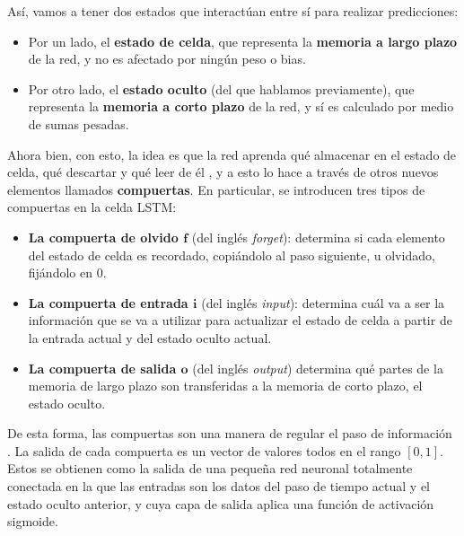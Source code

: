 \documentclass[../../main.tex]{subfiles}
\begin{document}
Así, vamos a tener dos estados que interactúan entre sí para realizar predicciones:
\begin{itemize}
    \item Por un lado, el \textbf{estado de celda}, que representa la \textbf{memoria a largo
    plazo} de la red, y no es afectado por ningún peso o bias.
    \item Por otro lado, el \textbf{estado oculto} (del que hablamos previamente), que
    representa la \textbf{memoria a corto plazo} de la red, y sí es calculado por medio
    de sumas pesadas.
\end{itemize}

Ahora bien, con esto, la idea es que la red aprenda qué almacenar en el estado de celda,
qué descartar y qué leer de él \cite{hands-on-ML-sklearn-tf}, y a esto lo hace a través de
otros nuevos elementos llamados \textbf{compuertas}. En particular, se introducen tres
tipos de compuertas en la celda LSTM:
\begin{itemize}
    \item \textbf{La compuerta de olvido \(\bm{f}\)} (del inglés \textit{forget}):
    determina si cada elemento del estado de celda es recordado, copiándolo al paso
    siguiente, u olvidado, fijándolo en 0.
    \item \textbf{La compuerta de entrada \(\bm{i}\)} (del inglés \textit{input}):
    determina cuál va a ser la información que se va a utilizar para actualizar
    el estado de celda a partir de la entrada actual y del estado oculto actual.
    \item \textbf{La compuerta de salida \(\bm{o}\)} (del inglés \textit{output})
    determina qué partes de la memoria de largo plazo son transferidas a la memoria
    de corto plazo, el estado oculto.
\end{itemize}

De esta forma, las compuertas son una manera de regular el paso de información
\cite{colahs-blog-lstm-2015}. La salida de cada compuerta es un vector de valores todos en
el rango \([0,1]\). Estos se obtienen como la salida de una pequeña red neuronal
totalmente conectada en la que las entradas son los datos del paso de tiempo actual y el
estado oculto anterior, y cuya capa de salida aplica una función de activación sigmoide.
\end{document}

